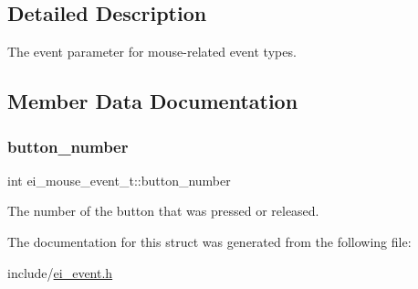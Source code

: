 \subsection{Detailed Description}
The event parameter for mouse-\/related event types. 

\subsection{Member Data Documentation}
\mbox{\label{structei__mouse__event__t_a3165d2e07c861aa9ccb114a10a6b0afb}} 
\subsubsection{\texorpdfstring{button\+\_\+number}{button\_number}}
{\footnotesize\ttfamily int ei\+\_\+mouse\+\_\+event\+\_\+t\+::button\+\_\+number}

The number of the button that was pressed or released. 

The documentation for this struct was generated from the following file\+:\begin{DoxyCompactItemize}
\item 
include/\hyperlink{ei__event_8h}{ei\+\_\+event.\+h}\end{DoxyCompactItemize}
